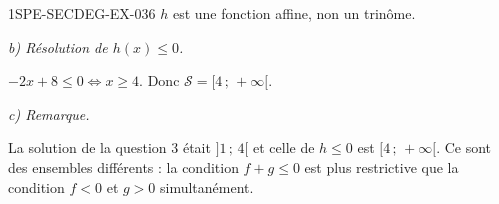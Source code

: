 \begin{corrige}{1SPE-SECDEG-EX-036}
$h$ est une fonction affine, non un trinôme.

\textit{b) Résolution de $h(x) \leqslant 0$.}

$-2x + 8 \leqslant 0 \iff x \geqslant 4$. Donc $\mathcal{S} = [4\,;\,+\infty[$.

\textit{c) Remarque.}

La solution de la question 3 était $]1\,;\,4[$ et celle de $h \leqslant 0$ est $[4\,;\,+\infty[$. Ce sont des ensembles différents : la condition $f + g \leqslant 0$ est plus restrictive que la condition $f < 0$ et $g > 0$ simultanément.

\end{corrige}
